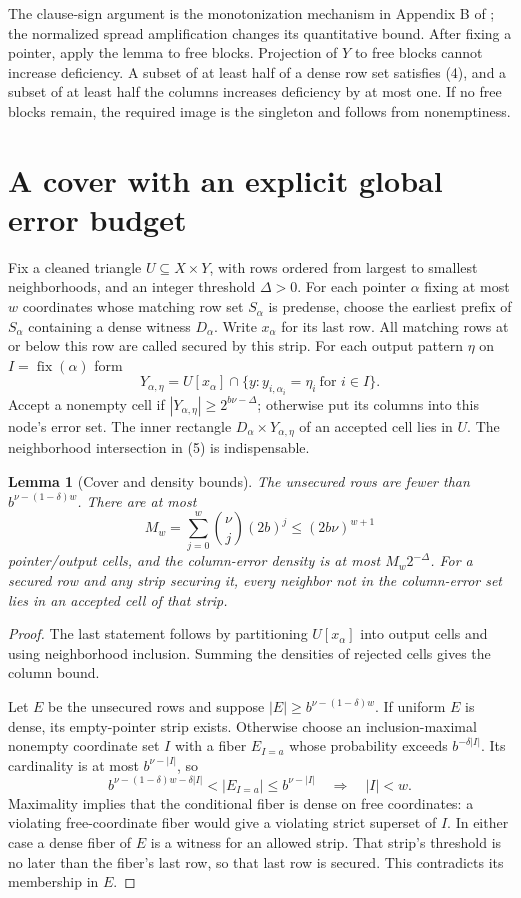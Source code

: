 \documentclass[11pt]{article}
\newtheorem{lemma}[theorem]{Lemma}
\begin{document}
The clause-sign argument is the monotonization mechanism in Appendix B of
\cite{tradeoff}; the normalized spread amplification changes its quantitative
bound. After fixing a pointer, apply the lemma to free blocks. Projection
of $Y$ to free blocks cannot increase deficiency. A subset of at least half
of a dense row set satisfies (4), and a subset of at least half the columns
increases deficiency by at most one. If no free blocks remain, the required
image is the singleton and follows from nonemptiness.

\section{A cover with an explicit global error budget}
Fix a cleaned triangle $U\subseteq X\times Y$, with rows ordered from
largest to smallest neighborhoods, and an integer threshold $\Delta>0$.
For each pointer $\alpha$ fixing at most $w$ coordinates whose matching row
set $S_\alpha$ is predense, choose the earliest prefix of $S_\alpha$
containing a dense witness $D_\alpha$. Write $x_\alpha$ for its last row.
All matching rows at or below this row are called secured by this strip.
For each output pattern $\eta$ on $I=\operatorname{fix}(\alpha)$ form
\[
 Y_{\alpha,\eta}=U[x_\alpha]\cap
       \{y:y_{i,\alpha_i}=\eta_i\ \text{for }i\in I\}.      \tag{5}
\]
Accept a nonempty cell if $|Y_{\alpha,\eta}|\ge2^{b\nu-\Delta}$;
otherwise put its columns into this node's error set. The inner rectangle
$D_\alpha\times Y_{\alpha,\eta}$ of an accepted cell lies in $U$. The
neighborhood intersection in (5) is indispensable.

\begin{lemma}[Cover and density bounds]\label{lem:cover}
The unsecured rows are fewer than $b^{\nu-(1-\delta)w}$. There are at most
\[
 M_w=\sum_{j=0}^w\binom\nu j(2b)^j\le(2b\nu)^{w+1}        \tag{6}
\]
pointer/output cells, and the column-error density is at most
$M_w2^{-\Delta}$. For a secured row and any strip securing it, every
neighbor not in the column-error set lies in an accepted cell of that strip.
\end{lemma}
\begin{proof}
The last statement follows by partitioning $U[x_\alpha]$ into output cells
and using neighborhood inclusion. Summing the densities of rejected cells
gives the column bound.

Let $E$ be the unsecured rows and suppose
$|E|\ge b^{\nu-(1-\delta)w}$. If uniform $E$ is dense, its empty-pointer
strip exists. Otherwise choose an inclusion-maximal nonempty coordinate
set $I$ with a fiber $E_{I=a}$ whose probability exceeds
$b^{-\delta|I|}$. Its cardinality is at most $b^{\nu-|I|}$, so
\[
 b^{\nu-(1-\delta)w-\delta|I|}
 < |E_{I=a}|\le b^{\nu-|I|}
 \quad\Longrightarrow\quad |I|<w.
\]
Maximality implies that the conditional fiber is dense on free coordinates:
a violating free-coordinate fiber would give a violating strict superset
of $I$. In either case a dense fiber of $E$ is a witness for an allowed
strip. That strip's threshold is no later than the fiber's last row, so
that last row is secured. This contradicts its membership in $E$.
\end{proof}
\end{document}

